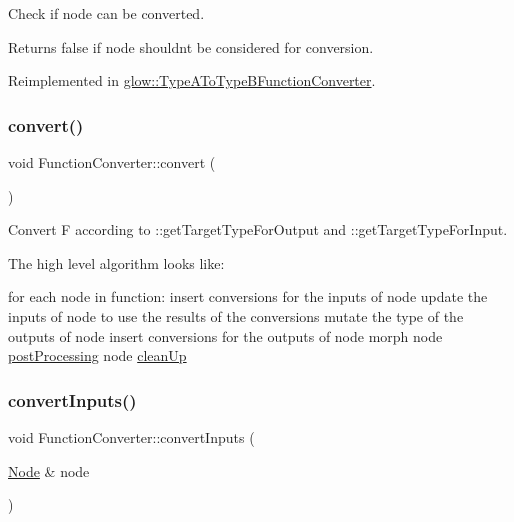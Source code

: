 Check if {\ttfamily node} can be converted. \begin{DoxyReturn}{Returns}
false if {\ttfamily node} shouldn\textquotesingle{}t be considered for conversion. 
\end{DoxyReturn}


Reimplemented in \hyperlink{classglow_1_1_type_a_to_type_b_function_converter_acb83d144def5ae09b64f354430c2f643}{glow\+::\+Type\+A\+To\+Type\+B\+Function\+Converter}.

\mbox{\label{classglow_1_1_function_converter_ab8873d75c864d9e92359f70424394e70}} 
\subsubsection{\texorpdfstring{convert()}{convert()}}
{\footnotesize\ttfamily void Function\+Converter\+::convert (\begin{DoxyParamCaption}{ }\end{DoxyParamCaption})}

Convert {\ttfamily F} according to \+::get\+Target\+Type\+For\+Output and \+::get\+Target\+Type\+For\+Input.

The high level algorithm looks like\+: 
\begin{DoxyCode}
\textcolor{keywordflow}{for each} node in \textcolor{keyword}{function}:
  insert conversions \textcolor{keywordflow}{for} the inputs of node
  update the inputs of node to use the results of the conversions
  mutate the type of the outputs of node
  insert conversions \textcolor{keywordflow}{for} the outputs of node
  morph node
  \hyperlink{classglow_1_1_function_converter_aeee98175ffd8d13a1fdd7e38d38811b2}{postProcessing} node
\hyperlink{classglow_1_1_function_converter_a503372fedd4a868e3a500f4efd7c0eab}{cleanUp}
\end{DoxyCode}
 \mbox{\label{classglow_1_1_function_converter_adb30ff2f805fc710e1a2ca325afbebe9}} 
\subsubsection{\texorpdfstring{convert\+Inputs()}{convertInputs()}}
{\footnotesize\ttfamily void Function\+Converter\+::convert\+Inputs (\begin{DoxyParamCaption}\item[{\hyperlink{classglow_1_1_node}{Node} \&}]{node }\end{DoxyParamCaption})\hspace{0.3cm}{\ttfamily [protected]}}

